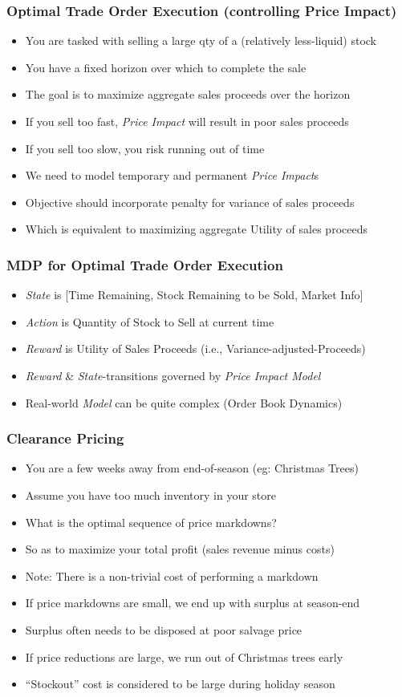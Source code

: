 \documentclass[handout]{beamer}
\begin{document}
\begin{frame}
\frametitle{Optimal Trade Order Execution (controlling Price Impact)}
\pause
\begin{itemize}[<+->]
\item You are tasked with selling a large qty of a (relatively less-liquid) stock
\item You have a fixed horizon over which to complete the sale
\item The goal is to maximize aggregate sales proceeds over the horizon
\item If you sell too fast, {\em Price Impact} will result in poor sales proceeds
\item If you sell too slow, you risk running out of time
\item We need to model temporary and permanent {\em Price Impact}s
\item Objective should incorporate penalty for variance of sales proceeds
\item Which is equivalent to maximizing aggregate Utility of sales proceeds 
\end{itemize}
\end{frame}

\begin{frame}
\frametitle{MDP for Optimal Trade Order Execution}
\pause
\begin{itemize}
\item {\em State} is [Time Remaining, Stock Remaining to be Sold, Market Info]
\item {\em Action} is Quantity of Stock to Sell at current time
\item {\em Reward} is Utility of Sales Proceeds (i.e., Variance-adjusted-Proceeds)
\item {\em Reward} \& {\em State}-transitions governed by {\em Price Impact Model}
\item Real-world {\em Model} can be quite complex (Order Book Dynamics)
\end{itemize}
\end{frame}

\begin{frame}
\frametitle{Clearance Pricing}
\pause
\begin{itemize}[<+->]
\item You are a few weeks away from end-of-season (eg: Christmas Trees)
\item Assume you have too much inventory in your store
\item What is the optimal sequence of price markdowns?
\item So as to maximize your total profit (sales revenue minus costs)
\item Note: There is a non-trivial cost of performing a markdown
\item If price markdowns are small, we end up with surplus at season-end
\item Surplus often needs to be disposed at poor salvage price
\item If price reductions are large, we run out of Christmas trees early
\item ``Stockout'' cost is considered to be large during holiday season
\end{itemize}
\end{frame}
\end{document}
